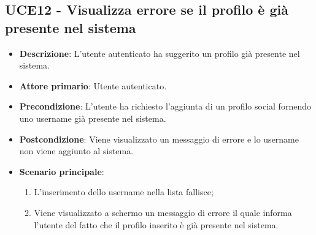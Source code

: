 \subsection{UCE12 - Visualizza errore se il profilo è già presente nel sistema}
\begin{itemize}
	\item \textbf{Descrizione}: L'utente autenticato ha suggerito un profilo già presente nel sistema.
    \item \textbf{Attore primario}: Utente autenticato.
    \item \textbf{Precondizione}: L’utente ha richiesto l’aggiunta di un profilo social fornendo uno username già presente nel sistema.
    \item \textbf{Postcondizione}: Viene visualizzato un messaggio di errore e lo username non viene aggiunto al sistema.
    \item \textbf{Scenario principale}: 
    \begin{enumerate}
        \item L'inserimento dello username nella lista fallisce;
        \item Viene visualizzato a schermo un messaggio di errore il quale informa l'utente del fatto che il profilo inserito è già presente nel sistema.
    \end{enumerate}
\end{itemize}
